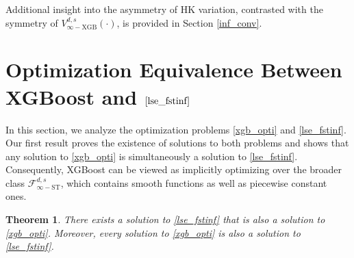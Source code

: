 \documentclass[10pt]{article}
\newtheorem{theorem}{Theorem}
\newcommand{\fstinf}{{\mathcal{F}^{d, s}_{\infty-\text{ST}}}}
\newcommand{\vinfxgb}{{V^{d, s}_{\infty-\text{XGB}}}}
\begin{document}
Additional insight into the asymmetry of HK variation, contrasted 
with the symmetry of $\vinfxgb(\cdot)$, is provided in 
Section \ref{inf_conv}.



\section{Optimization Equivalence Between XGBoost and 
$\eqref{lse_fstinf}$}
\label{sec:optimization}

In this section, we analyze the optimization problems 
\eqref{xgb_opti} and \eqref{lse_fstinf}. Our first result proves 
the existence of solutions to both problems and shows that any 
solution to \eqref{xgb_opti} is simultaneously a solution to 
\eqref{lse_fstinf}. Consequently, XGBoost can be viewed as 
implicitly optimizing over the broader class $\fstinf$, which 
contains smooth functions as well as piecewise constant ones.
\begin{theorem}\label{thm:xgb-opti-lse}
    There exists a solution to \eqref{lse_fstinf} that is also a
    solution to \eqref{xgb_opti}. Moreover, every solution to
    \eqref{xgb_opti} is also a solution to \eqref{lse_fstinf}. 
\end{theorem}
\end{document}
